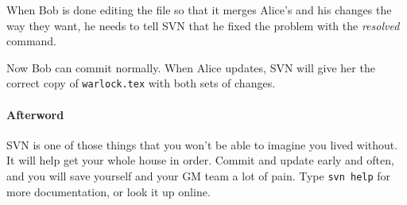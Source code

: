 \documentclass[green]{testgame}
\begin{document}
When Bob is done editing the file so that it merges Alice's and his
changes the way they want, he needs to tell SVN that he fixed the
problem with the {\em resolved} command.


Now Bob can commit normally. When Alice updates, SVN will give her the
correct copy of {\tt warlock.tex} with both sets of changes.

\paragraph*{Afterword}

SVN is one of those things that you won't be able to imagine you lived
without. It will help get your whole house in order. Commit and update
early and often, and you will save yourself and your GM team a lot of
pain. Type {\tt svn help} for more documentation, or look it up
online.
\end{document}
